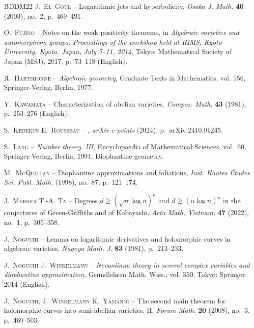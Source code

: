 \documentclass[11pt,english]{smfart}
\theoremstyle{plain}
\theoremstyle{definition}
\theoremstyle{remark}
\numberwithin{equation}{section}
\theoremstyle{plain}
\begin{document}
\begin{thebibliography}{BDDM22}
		{\scshape J.~El~Goul} -- {\og Logarithmic jets and hyperbolicity\fg},
		\emph{Osaka J. Math.} \textbf{40} (2003), no.~2, p.~469--491.
		
		{\scshape O.~Fujino} -- {\og Notes on the weak positivity theorems\fg}, in
		\emph{Algebraic varieties and automorphism groups. Proceedings of the
			workshop held at RIMS, Kyoto University, Kyoto, Japan, July 7--11, 2014},
		Tokyo: Mathematical Society of Japan (MSJ), 2017, p.~73--118 (English).
		
		{\scshape R.~Hartshorne} -- \emph{Algebraic geometry}, Graduate Texts in
		Mathematics, vol. 156, Springer-Verlag, Berlin, 1977.
		
		{\scshape Y.~Kawamata} -- {\og Characterization of abelian varieties\fg},
		\emph{Compos. Math.} \textbf{43} (1981), p.~253--276 (English).
		
		{\scshape S.~{Kebekus} {\normalfont \smfandname} E.~{Rousseau}} -- {\fg}, \emph{arXiv e-prints} (2024),
		p.~arXiv:2410.01245.
		
		{\scshape S.~Lang} -- \emph{Number theory. {III}}, Encyclopaedia of
		Mathematical Sciences, vol.~60, Springer-Verlag, Berlin, 1991, Diophantine
		geometry.
		
		{\scshape M.~McQuillan} -- {\og Diophantine approximations and foliations\fg},
		\emph{Inst. Hautes \'Etudes Sci. Publ. Math.} (1998), no.~87, p.~121--174.
		
		{\scshape J.~Merker {\normalfont \smfandname} T.-A. Ta} -- {\og Degrees {$d
				\geqslant(\sqrt{n} \log n)^n$} and {$d\geqslant (n\log n)^n$} in the
			conjectures of {G}reen-{G}riffiths and of {K}obayashi\fg}, \emph{Acta Math.
			Vietnam.} \textbf{47} (2022), no.~1, p.~305--358.
		
		{\scshape J.~Noguchi} -- {\og Lemma on logarithmic derivatives and holomorphic
			curves in algebraic varieties\fg}, \emph{Nagoya Math. J.} \textbf{83} (1981),
		p.~213--233.
		
		{\scshape J.~Noguchi {\normalfont \smfandname} J.~Winkelmann} --
		\emph{Nevanlinna theory in several complex variables and diophantine
			approximation}, Grundlehren Math. Wiss., vol. 350, Tokyo: Springer, 2014
		(English).
		
		{\scshape J.~Noguchi, J.~Winkelmann {\normalfont \smfandname} K.~Yamanoi} --
		{\og The second main theorem for holomorphic curves into semi-abelian
			varieties. {II}\fg}, \emph{Forum Math.} \textbf{20} (2008), no.~3,
		p.~469--503.
		

\end{thebibliography}
\end{document}
